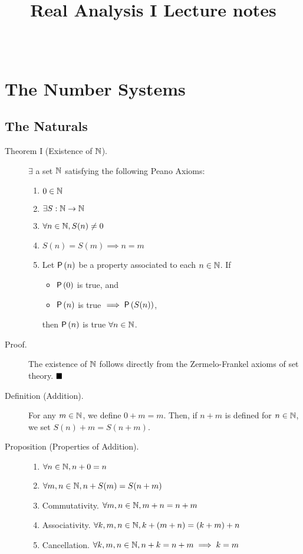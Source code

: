 \documentclass[letterpaper,11pt]{article}
\author{\myname \\ \myandrew}
\title{Real Analysis I Lecture notes}
\begin{document}
\section{The Number Systems}
\subsection{The Naturals}
\begin{description}
\item[Theorem I (Existence of $\mathbb{N}$).] $\exists$ a set $\mathbb{N}$
    satisfying the following Peano Axioms:
    \begin{enumerate}[(P{A}1)]
    \item $0\in\mathbb{N}$
    \item $\exists S:\mathbb{N}\rightarrow\mathbb{N}$
    \item $\forall n\in\mathbb{N}, S(n)\ne 0$
    \item $S(n)=S(m) \implies n=m$
    \item Let $\mathsf{P}\left(n\right)$ be a property associated to each $n\in\mathbb{N}$. If
      \begin{itemize}
      \item $\mathsf{P}\left(0\right)$ is true, and
      \item $\mathsf{P}\left(n\right)$ is true $\implies \mathsf{P}\left(S(n)\right)$,
      \end{itemize}
    then $\mathsf{P}\left(n\right)$ is true $\forall n\in\mathbb{N}$.
    \end{enumerate}

\item[Proof.] The existence of $\mathbb{N}$ follows directly from the
    Zermelo-Frankel axioms of set theory. $\hfill\blacksquare$


% 


\item[Definition (Addition).] For any $m\in\mathbb{N}$, we define $0+m=m$.
    Then, if $n+m$ is defined for $n\in\mathbb{N}$, we set $S(n)+m = S(n+m)$.

\item[Proposition (Properties of Addition).]\mbox{}
  \begin{enumerate}[({A}1)]
  \item $\forall n\in\mathbb{N}, n+0 = n$
  \item $\forall m,n\in\mathbb{N}, n+S(m) = S(n+m)$
  \item Commutativity. $\forall m,n\in\mathbb{N}, m+n = n+m$
  \item Associativity. $\forall k,m,n\in\mathbb{N}, k+(m+n) = (k+m)+n$
  \item Cancellation. $\forall k,m,n\in\mathbb{N}, n+k = n+m \implies k = m$
  \end{enumerate}


\end{description}
\end{document}
